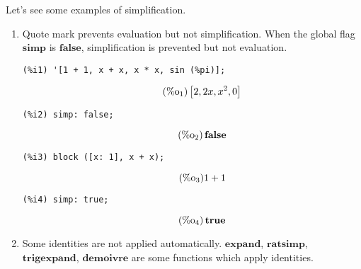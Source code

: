 \documentclass[12pt,leqno]{article}
\begin{document}
Let's see some examples of simplification.

\begin{enumerate}

\item Quote mark prevents evaluation but not simplification.
When the global flag $\mathbf{simp}$ is $\mathbf{false}$,
simplification is prevented but not evaluation.

\begin{verbatim}
(%i1) '[1 + 1, x + x, x * x, sin (%pi)];
\end{verbatim}
\begin{equation}
\tag{$\mathop{\mathrm{\%o}_{1}}$}\left[2, 2 x, {x}^{2}, 0\right]
\label{eq:doc-group1-code21-1-1}
\end{equation}
\begin{verbatim}
(%i2) simp: false;
\end{verbatim}
\begin{equation}
\tag{$\mathop{\mathrm{\%o}_{2}}$}\mathop{\mathbf{false}}
\label{eq:doc-group1-code21-2-1}
\end{equation}
\begin{verbatim}
(%i3) block ([x: 1], x + x);
\end{verbatim}
\begin{equation}
\tag{$\mathop{\mathrm{\%o}_{3}}$}1+1
\label{eq:doc-group1-code21-3-1}
\end{equation}
\begin{verbatim}
(%i4) simp: true;
\end{verbatim}
\begin{equation}
\tag{$\mathop{\mathrm{\%o}_{4}}$}\mathop{\mathbf{true}}
\label{eq:doc-group1-code21-4-1}
\end{equation}


\item Some identities are not applied automatically.
$\mathbf{expand}$, $\mathbf{ratsimp}$, $\mathbf{trigexpand}$, $\mathbf{demoivre}$
are some functions which apply identities.


\end{enumerate}
\end{document}
